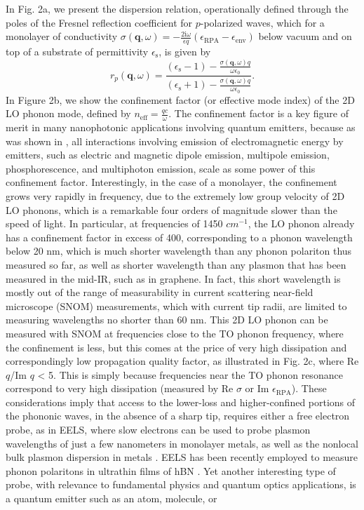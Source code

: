\documentclass[aps,prb,twocolumn,
groupedaddress,superscriptaddress,
amsfonts,amssymb,amsmath,floatfix,
citeautoscript]{revtex4-1}
\newcommand{\iu}{\mathrm{i}}
\begin{document}
	In Fig. 2a, we present the dispersion relation, operationally defined through the poles of the Fresnel reflection coefficient for $p$-polarized waves, which for a monolayer of conductivity $\sigma(\mathbf{q},\omega) = -\frac{2\iu \omega}{\epsilon q}\left(\epsilon_{\mathrm{RPA}} - \epsilon_{\mathrm{env}} \right)$ below vacuum and on top of a substrate of permittivity $\epsilon_{\mathrm{s}}$, is given by
	\begin{equation}
	r_p(\mathbf{q},\omega) = \frac{(\epsilon_{\mathrm{s}}-1)-\frac{\sigma(\mathbf{q},\omega) q}{\omega\epsilon_0}}{(\epsilon_{\mathrm{s}}+1)-\frac{\sigma(\mathbf{q},\omega) q}{\omega \epsilon_0}}.
	\end{equation}
	In Figure 2b, we show the confinement factor (or effective mode index) of the 2D LO phonon mode, defined by $n_{\mathrm{eff}} = \frac{qc}{\omega}$. The confinement factor is a key figure of merit in many nanophotonic applications involving quantum emitters, because as was shown in \cite{archambault2010quantum,koppens2011graphene,rivera2016shrinking,rivera2017making}, all interactions involving emission of electromagnetic energy by emitters, such as electric and magnetic dipole emission, multipole emission, phosphorescence, and multiphoton emission, scale as some power of this confinement factor. Interestingly, in the case of a monolayer, the confinement grows very rapidly in frequency, due to the extremely low group velocity of 2D LO phonons, which is a remarkable four orders of magnitude slower than the speed of light.  In particular, at frequencies of 1450 $cm^{-1}$, the LO phonon already has a confinement factor in excess of 400, corresponding to a phonon wavelength below 20 nm, which is much shorter wavelength than any phonon polariton thus measured so far, as well as shorter wavelength than any plasmon that has been measured in the mid-IR, such as in graphene. In fact, this short wavelength is mostly out of the range of measurability in current scattering near-field microscope (SNOM) measurements, which with current tip radii, are limited to measuring wavelengths no shorter than 60 nm. This 2D LO phonon can be measured with SNOM at frequencies close to the TO phonon frequency, where the confinement is less, but this comes at the price of very high dissipation and correspondingly low propagation quality factor, as illustrated in Fig. 2c, where Re $q$/Im $q$ < 5. This is simply because frequencies near the TO phonon resonance correspond to very high dissipation (measured by $\text{Re }\sigma$ or $\text{Im }\epsilon_{\mathrm{RPA}}$). These considerations imply that access to the lower-loss and higher-confined portions of the phononic waves, in the absence of a sharp tip, requires either a free electron probe, as in EELS, where slow electrons can be used to probe plasmon wavelengths of just a few nanometers in monolayer metals, as well as the nonlocal bulk plasmon dispersion in metals \cite{nagao2001dispersion,diaconescu2007acoustic,de2010optical}. EELS has been recently employed to measure phonon polaritons in ultrathin films of hBN \cite{govyadinov2017probing}. Yet another interesting type of probe, with relevance to fundamental physics and quantum optics applications, is a quantum emitter such as an atom, molecule, or 
\end{document}

